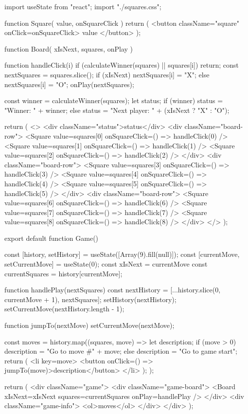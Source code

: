 import { useState } from "react";
import "./squares.css";

function Square({ value, onSquareClick }) {
	return (
		<button className="square" onClick={onSquareClick}>
			{value}
		</button>
	);
}

function Board({ xIsNext, squares, onPlay }) {
	function handleClick(i) {
		if (calculateWinner(squares) || squares[i]) {
			return;
		}
		const nextSquares = squares.slice();
		if (xIsNext) {
			nextSquares[i] = "X";
		} else {
			nextSquares[i] = "O";
		}
		onPlay(nextSquares);
	}

	const winner = calculateWinner(squares);
	let status;
	if (winner) {
		status = "Winner: " + winner;
	} else {
		status = "Next player: " + (xIsNext ? "X" : "O");
	}

	return (
		<>
			<div className="status">{status}</div>
			<div className="board-row">
				<Square
					value={squares[0]}
					onSquareClick={() => handleClick(0)}
				/>
				<Square
					value={squares[1]}
					onSquareClick={() => handleClick(1)}
				/>
				<Square
					value={squares[2]}
					onSquareClick={() => handleClick(2)}
				/>
			</div>
			<div className="board-row">
				<Square
					value={squares[3]}
					onSquareClick={() => handleClick(3)}
				/>
				<Square
					value={squares[4]}
					onSquareClick={() => handleClick(4)}
				/>
				<Square
					value={squares[5]}
					onSquareClick={() => handleClick(5)}
				/>
			</div>
			<div className="board-row">
				<Square
					value={squares[6]}
					onSquareClick={() => handleClick(6)}
				/>
				<Square
					value={squares[7]}
					onSquareClick={() => handleClick(7)}
				/>
				<Square
					value={squares[8]}
					onSquareClick={() => handleClick(8)}
				/>
			</div>
		</>
	);
}

export default function Game() {
	const [history, setHistory] = useState([Array(9).fill(null)]);
	const [currentMove, setCurrentMove] = useState(0);
	const xIsNext = currentMove %
	const currentSquares = history[currentMove];

	function handlePlay(nextSquares) {
		const nextHistory = [...history.slice(0, currentMove + 1), nextSquares];
		setHistory(nextHistory);
		setCurrentMove(nextHistory.length - 1);
	}

	function jumpTo(nextMove) {
		setCurrentMove(nextMove);
	}

	const moves = history.map((squares, move) => {
		let description;
		if (move > 0) {
			description = "Go to move #" + move;
		} else {
			description = "Go to game start";
		}
		return (
			<li key={move}>
				<button onClick={() => jumpTo(move)}>{description}</button>
			</li>
		);
	});

	return (
		<div className="game">
			<div className="game-board">
				<Board
					xIsNext={xIsNext}
					squares={currentSquares}
					onPlay={handlePlay}
				/>
			</div>
			<div className="game-info">
				<ol>{moves}</ol>
			</div>
		</div>
	);
}

